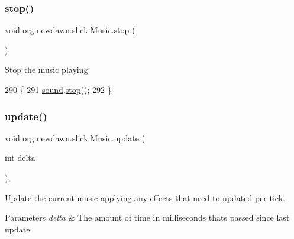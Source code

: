 \subsubsection{\texorpdfstring{stop()}{stop()}}
{\footnotesize\ttfamily void org.\+newdawn.\+slick.\+Music.\+stop (\begin{DoxyParamCaption}{ }\end{DoxyParamCaption})\hspace{0.3cm}{\ttfamily [inline]}}

Stop the music playing 
\begin{DoxyCode}
290                        \{
291         \mbox{\hyperlink{classorg_1_1newdawn_1_1slick_1_1_music_a17daed326f24bf361ff8677c33f06b2f}{sound}}.\mbox{\hyperlink{interfaceorg_1_1newdawn_1_1slick_1_1openal_1_1_audio_a8346ca83b84cb6605efb695462f12337}{stop}}();
292     \}
\end{DoxyCode}
\mbox{\label{classorg_1_1newdawn_1_1slick_1_1_music_a93a114f3bdb3751b6df3650e5993cf13}} 
\subsubsection{\texorpdfstring{update()}{update()}}
{\footnotesize\ttfamily void org.\+newdawn.\+slick.\+Music.\+update (\begin{DoxyParamCaption}\item[{int}]{delta }\end{DoxyParamCaption})\hspace{0.3cm}{\ttfamily [inline]}, {\ttfamily [package]}}

Update the current music applying any effects that need to updated per tick.


\begin{DoxyParams}{Parameters}
{\em delta} & The amount of time in milliseconds thats passed since last update \\
\hline
\end{DoxyParams}

